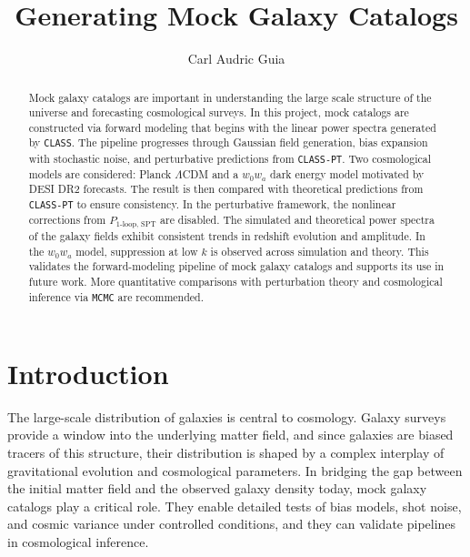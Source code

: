 \documentclass[trackchanges]{aastex7}
\begin{document}
\title{Generating Mock Galaxy Catalogs}

\author[0009-0009-7258-1637]{Carl Audric Guia}

\begin{abstract}
    Mock galaxy catalogs are important in understanding the large scale structure of the universe and forecasting cosmological surveys.
    In this project, mock catalogs are constructed via forward modeling that begins with the linear power spectra generated by \texttt{CLASS}.
    The pipeline progresses through Gaussian field generation, bias expansion with stochastic noise, and perturbative predictions from \texttt{CLASS-PT}.
    Two cosmological models are considered: Planck \(\Lambda\)CDM and a \( w_0w_a \) dark energy model motivated by DESI DR2 forecasts.
    The result is then compared with theoretical predictions from \texttt{CLASS-PT} to ensure consistency.
    In the perturbative framework, the nonlinear corrections from \( P_{\text{1-loop, SPT}} \) are disabled.
    The simulated and theoretical power spectra of the galaxy fields exhibit consistent trends in redshift evolution and amplitude.
    In the $w_0 w_a$ model, suppression at low $k$ is observed across simulation and theory.
    This validates the forward-modeling pipeline of mock galaxy catalogs and supports its use in future work.
    More quantitative comparisons with perturbation theory and cosmological inference via \texttt{MCMC} are recommended.
    \end{abstract}
\section{Introduction} \label{sec:intro}
The large-scale distribution of galaxies is central to cosmology. 
Galaxy surveys provide a window into the underlying matter field, and since galaxies are biased tracers of this structure, their distribution is shaped by a complex interplay of gravitational evolution and cosmological parameters. 
In bridging the gap between the initial matter field and the observed galaxy density today, mock galaxy catalogs play a critical role. 
They enable detailed tests of bias models, shot noise, and cosmic variance under controlled conditions, and they can validate pipelines in cosmological inference. 
\end{document}
